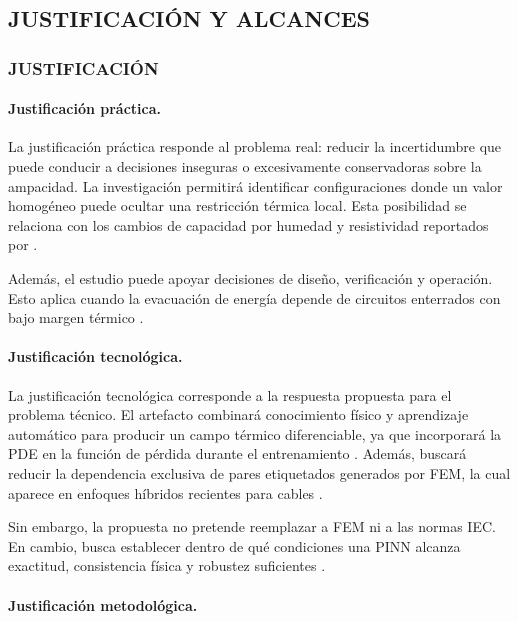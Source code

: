 \documentclass[11pt,a4paper,oneside]{report}
\begin{document}
\subsection{JUSTIFICACIÓN Y ALCANCES}

\subsubsection{JUSTIFICACIÓN}

\paragraph{Justificación práctica.}

La justificación práctica responde al problema real: reducir la incertidumbre que puede conducir a decisiones inseguras o excesivamente conservadoras sobre la ampacidad. La investigación permitirá identificar configuraciones donde un valor homogéneo puede ocultar una restricción térmica local. Esta posibilidad se relaciona con los cambios de capacidad por humedad y resistividad reportados por \textcite[1,6--9]{khumalo2025}.

Además, el estudio puede apoyar decisiones de diseño, verificación y operación. Esto aplica cuando la evacuación de energía depende de circuitos enterrados con bajo margen térmico \parencite[14842,14851]{fariz2026}.

\paragraph{Justificación tecnológica.}

La justificación tecnológica corresponde a la respuesta propuesta para el problema técnico. El artefacto combinará conocimiento físico y aprendizaje automático para producir un campo térmico diferenciable, ya que incorporará la PDE en la función de pérdida durante el entrenamiento \parencite[686--690]{raissi2019}. Además, buscará reducir la dependencia exclusiva de pares etiquetados generados por FEM, la cual aparece en enfoques híbridos recientes para cables \parencite[1--3,12]{aldulaimi2024}.

Sin embargo, la propuesta no pretende reemplazar a FEM ni a las normas IEC. En cambio, busca establecer dentro de qué condiciones una PINN alcanza exactitud, consistencia física y robustez suficientes \parencite[93--99]{cigre2025}.

\paragraph{Justificación metodológica.}
\end{document}
